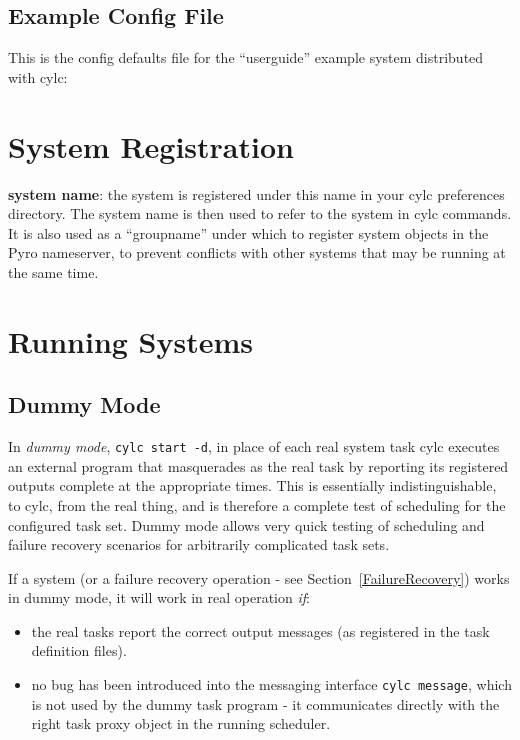 \documentclass[11pt,a4paper]{article}
\begin{document}
\pagebreak

\subsection{Example Config File}
\label{ExampleConfigFile}

This is the config defaults file for the ``userguide'' example system
distributed with cylc: 

\lstset{ language=Python }
{

}



\lstset{language=}

\pagebreak
\section{System Registration}
\label{SystemRegistration}

{\bf system name}: the system is registered under
        this name in your cylc preferences directory. The system name is
        then used to refer to the system in cylc commands. It is also
        used as a ``groupname'' under which to register system objects 
        in the Pyro nameserver, to prevent conflicts with other systems
        that may be running at the same time.


\section{Running Systems}
\label{RunningdSystems}

\subsection{Dummy Mode} 
\label{DummyMode}

In {\em dummy mode}, \lstinline=cylc start -d=, in place of each real
system task cylc executes an external program that masquerades as the
real task by reporting its registered outputs complete at the appropriate
times. This is essentially indistinguishable, to cylc, from the real
thing, and is therefore a complete test of scheduling for the configured
task set. Dummy mode allows very quick testing of scheduling and failure
recovery scenarios for arbitrarily complicated task sets.

If a system (or a failure recovery operation - see
Section~\ref{FailureRecovery}) works in dummy mode, it will work in real
operation {\em if}:
\begin{itemize}
    \item the real tasks report the correct output messages (as
        registered in the task definition files).
    \item no bug has been introduced into the messaging interface
        \lstinline=cylc message=, which is not used by the dummy 
        task program - it communicates directly with the right task
        proxy object in the running scheduler.
\end{itemize}
\end{document}
